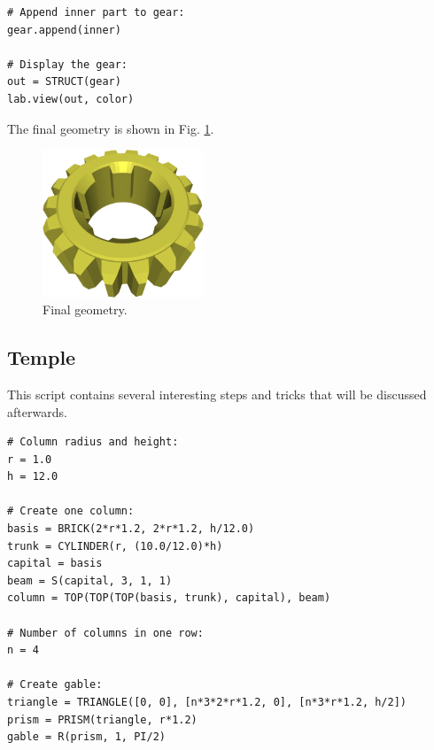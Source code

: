 {\small
\begin{bbox}
\begin{verbatim}
# Append inner part to gear:
gear.append(inner)

# Display the gear:
out = STRUCT(gear)
lab.view(out, color)
\end{verbatim}
\end{bbox}
}
\vspace{6mm}

\noindent
The final geometry is shown in Fig. \ref{fig:gear-last}.
\newpage
\begin{figure}[!ht]
\begin{center}
\includegraphics[width=0.43\textwidth]{img/gear-last.png}
\end{center}
\vspace{-4mm}
\caption{Final geometry.}
\label{fig:gear-last}
\end{figure}
\noindent


\subsection{Temple}

This script contains several interesting steps and tricks that will 
be discussed afterwards.\\

{\small
\begin{bbox}
\begin{verbatim}
# Column radius and height:
r = 1.0
h = 12.0

# Create one column:
basis = BRICK(2*r*1.2, 2*r*1.2, h/12.0) 
trunk = CYLINDER(r, (10.0/12.0)*h)
capital = basis
beam = S(capital, 3, 1, 1) 
column = TOP(TOP(TOP(basis, trunk), capital), beam)

# Number of columns in one row:
n = 4

# Create gable:
triangle = TRIANGLE([0, 0], [n*3*2*r*1.2, 0], [n*3*r*1.2, h/2])
prism = PRISM(triangle, r*1.2)
gable = R(prism, 1, PI/2)
\end{verbatim}
\end{bbox}
}


